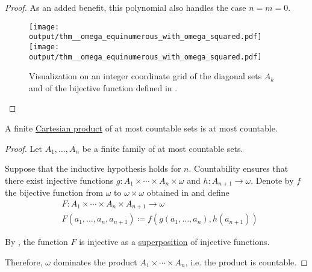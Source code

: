 \begin{proof}
  As an added benefit, this polynomial also handles the case \( n = m = 0 \).

  \begin{figure}[!ht]
    \hfill
    \texttt{[image: output/thm\_\_omega\_equinumerous\_with\_omega\_squared.pdf]}
    \hfill
    \texttt{[image: output/thm\_\_omega\_equinumerous\_with\_omega\_squared.pdf]}
    \hfill\hfill
    \caption{Visualization on an integer coordinate grid of the diagonal sets \( A_k \) and of the bijective function defined in .}\label{fig:thm:omega_equinumerous_with_omega_squared}
  \end{figure}
\end{proof}

\begin{corollary}\label{thm:countable_product_of_countable_sets}
  A finite \hyperref[def:cartesian_product]{Cartesian product} of at most countable sets is at most countable.
\end{corollary}
\begin{proof}
  Let \( A_1, \ldots, A_n \) be a finite family of at most countable sets.

  Suppose that the inductive hypothesis holds for \( n \). Countability ensures that there exist injective functions \( g: A_1 \times \cdots \times A_n \times \omega \) and \( h: A_{n+1} \to \omega \). Denote by \( f \) the bijective function from \( \omega \) to \( \omega \times \omega \) obtained in  and define
  \begin{equation*}
    \begin{aligned}
      &F: A_1 \times \cdots \times A_n \times A_{n+1} \to \omega \\
      &F(a_1, \ldots, a_n, a_{n+1}) \coloneqq f(g(a_1, \ldots, a_n), h(a_{n+1}))
    \end{aligned}
  \end{equation*}

  By , the function \( F \) is injective as a \hyperref[def:multi_valued_function/superposition]{superposition} of injective functions.

  Therefore, \( \omega \) dominates the product \( A_1 \times \cdots \times A_n \), i.e. the product is countable.
\end{proof}

